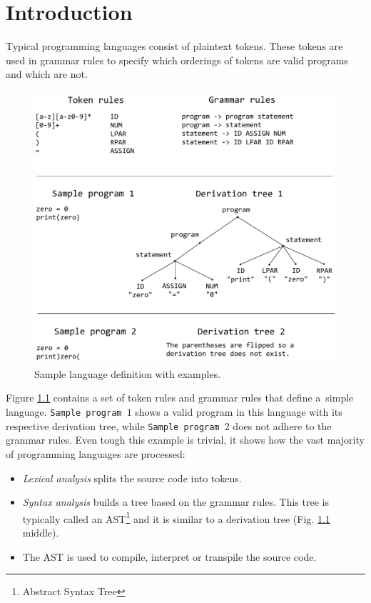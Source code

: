 \chapter{Introduction}

Typical programming languages consist of plaintext tokens. These tokens
are used in grammar rules to specify which orderings of tokens are valid programs and
which are not.
\begin{figure}[!hbt]
	\includegraphics[width=\textwidth]{../img/tokens_and_grammar}
	\caption{Sample language definition with examples.}
	\label{fig:chap1:tokens_and_grammar}
\end{figure}

Figure \ref{fig:chap1:tokens_and_grammar} contains a set of token rules and grammar rules that define a~simple
language. \texttt{Sample program $1$} shows a valid program in this language with its respective derivation tree, while
\texttt{Sample program $2$} does not adhere to the grammar rules.
Even tough this example is trivial, it shows how the vast majority of programming languages are processed:
\begin{itemize}
\item \emph{Lexical analysis} splits the source code into tokens.
\item \emph{Syntax analysis} builds a tree based on the grammar rules. This tree is typically called an AST\footnote{Abstract Syntax Tree}
and it is similar to a derivation tree (Fig. \ref{fig:chap1:tokens_and_grammar} middle).
\item The AST is used to compile, interpret or transpile the source code.
\end{itemize}

